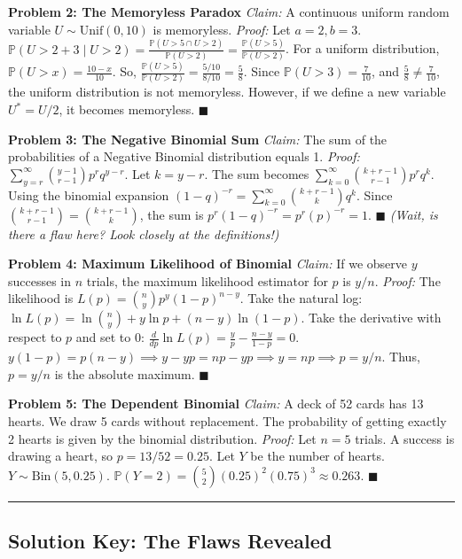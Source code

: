 \documentclass[11pt, letterpaper]{article}
\theoremstyle{definition}
\theoremstyle{remark}
\newcommand{\Prob}{\mathbb{P}}
\begin{document}
\textbf{Problem 2: The Memoryless Paradox}
\textit{Claim:} A continuous uniform random variable $U \sim \mathrm{Unif}(0, 10)$ is memoryless.
\textit{Proof:}
Let $a = 2, b = 3$. $\Prob(U > 2+3 \mid U > 2) = \frac{\Prob(U > 5 \cap U > 2)}{\Prob(U > 2)} = \frac{\Prob(U > 5)}{\Prob(U > 2)}$.
For a uniform distribution, $\Prob(U > x) = \frac{10-x}{10}$.
So, $\frac{\Prob(U > 5)}{\Prob(U > 2)} = \frac{5/10}{8/10} = \frac{5}{8}$.
Since $\Prob(U > 3) = \frac{7}{10}$, and $\frac{5}{8} \neq \frac{7}{10}$, the uniform distribution is not memoryless. However, if we define a new variable $U^* = U/2$, it becomes memoryless. $\blacksquare$

\textbf{Problem 3: The Negative Binomial Sum}
\textit{Claim:} The sum of the probabilities of a Negative Binomial distribution equals 1.
\textit{Proof:}
$\sum_{y=r}^\infty \binom{y-1}{r-1} p^r q^{y-r}$. Let $k = y-r$. The sum becomes $\sum_{k=0}^\infty \binom{k+r-1}{r-1} p^r q^k$.
Using the binomial expansion $(1-q)^{-r} = \sum_{k=0}^\infty \binom{k+r-1}{k} q^k$.
Since $\binom{k+r-1}{r-1} = \binom{k+r-1}{k}$, the sum is $p^r (1-q)^{-r} = p^r (p)^{-r} = 1$. $\blacksquare$
\textit{(Wait, is there a flaw here? Look closely at the definitions!)}

\textbf{Problem 4: Maximum Likelihood of Binomial}
\textit{Claim:} If we observe $y$ successes in $n$ trials, the maximum likelihood estimator for $p$ is $y/n$.
\textit{Proof:}
The likelihood is $L(p) = \binom{n}{y} p^y (1-p)^{n-y}$.
Take the natural log: $\ln L(p) = \ln \binom{n}{y} + y \ln p + (n-y) \ln(1-p)$.
Take the derivative with respect to $p$ and set to 0:
$\frac{d}{dp} \ln L(p) = \frac{y}{p} - \frac{n-y}{1-p} = 0$.
$y(1-p) = p(n-y) \implies y - yp = np - yp \implies y = np \implies p = y/n$.
Thus, $p = y/n$ is the absolute maximum. $\blacksquare$

\textbf{Problem 5: The Dependent Binomial}
\textit{Claim:} A deck of 52 cards has 13 hearts. We draw 5 cards without replacement. The probability of getting exactly 2 hearts is given by the binomial distribution.
\textit{Proof:}
Let $n = 5$ trials. A success is drawing a heart, so $p = 13/52 = 0.25$.
Let $Y$ be the number of hearts. $Y \sim \mathrm{Bin}(5, 0.25)$.
$\Prob(Y = 2) = \binom{5}{2} (0.25)^2 (0.75)^3 \approx 0.263$. $\blacksquare$

\vspace{1cm}
\hrule
\vspace{1cm}

\subsection{Solution Key: The Flaws Revealed}
\end{document}
